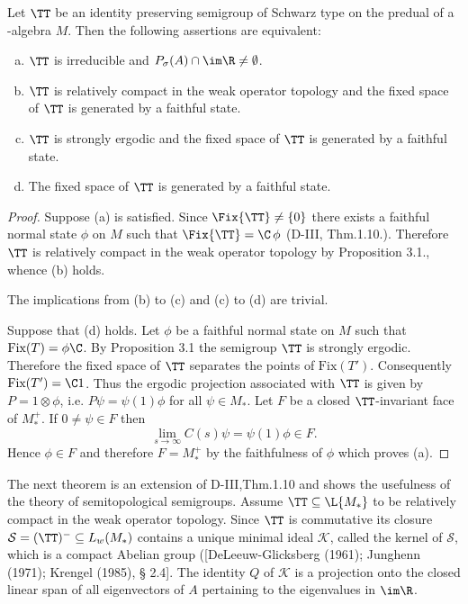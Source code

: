 \begin{proposition}\label{prop:d4-3.4}
Let $\TT$ be an identity preserving semigroup of Schwarz type on the predual of a \WA-algebra $M$.
Then the following assertions are equivalent:

\begin{enumerate}[(a)]
\item
$\TT$ is irreducible and $P_{\sigma}(A) \cap \im\R \neq \emptyset$.

\item
$\TT$ is relatively compact in the weak operator topology and the fixed space of\/ $\TT$ is generated by a faithful state.

\item
$\TT$ is strongly ergodic and the fixed space of\/ $\TT$ is generated by a faithful state.

\item
The fixed space of\/ $\TT$ is generated by a faithful state.
\end{enumerate}
\end{proposition}

\begin{proof}
Suppose (a) is satisfied.
Since $\Fix{\TT} \neq \{0\}$ there exists a faithful normal state $\phi$ on $M$ such that $\Fix{\TT} = \C \,\phi$ (D-III, Thm.1.10.).
Therefore $\TT$ is relatively compact in the weak operator topology by Proposition 3.1., whence (b) holds.

The implications from (b) to (c) and (c) to (d) are trivial.

Suppose that (d) holds.
Let $\phi$ be a faithful normal state on $M$ such that $\text{Fix}(T) = \phi\C$.
By Proposition 3.1 the semigroup $\TT$ is strongly ergodic.
Therefore the fixed space of\/ $\TT$ separates the points of $\text{Fix}(T')$.
Consequently $\text{Fix}(T') = \C1$.
Thus the ergodic projection associated with $\TT$ is given by $P = 1 \otimes \phi$, i.e. $P\psi = \psi(1)\phi$ for all $\psi \in M_{*}$.
Let $F$ be a closed $\TT$-invariant face of $M_{*}^{+}$.
If $0 \neq \psi \in F$ then
\[
\lim_{s \to \infty} C(s)\psi = \psi(1)\phi \in F.
\]
Hence $\phi \in F$ and therefore $F = M_{*}^{+}$ by the faithfulness of $\phi$ which proves (a).
\end{proof}

The next theorem is an extension of D-III,Thm.1.10 and shows the usefulness of the theory of semitopological semigroups.
Assume $\TT \subseteq \L{M_{*}}$ to be relatively compact in the weak operator topology.
Since $\TT$ is commutative its closure $\mathcal{S}  = (\TT)^{-} \subseteq L_{w}(M_{*})$ contains a unique minimal ideal $\mathcal{K}$, called the kernel of $\mathcal{S}$, which is a compact Abelian group ([DeLeeuw-Glicksberg (1961); Junghenn (1971); Krengel (1985), § 2.4].
The identity $Q$ of $\mathcal{K}$ is a projection onto the closed linear span of all eigenvectors of $ A $ pertaining to the eigenvalues in $ \im \R $.


